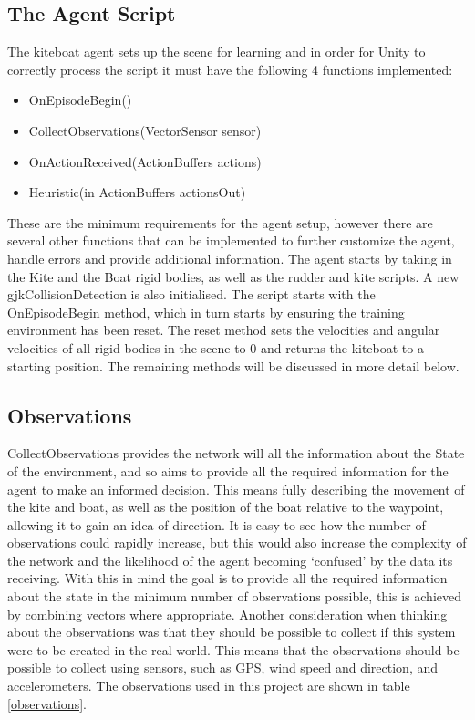 \subsection{The Agent Script}\label{agent_script}
The kiteboat agent sets up the scene for learning and in order for Unity to correctly process the script it must have the following 4 functions implemented:
\begin{itemize}
    \item OnEpisodeBegin()
    \item CollectObservations(VectorSensor sensor)
    \item OnActionReceived(ActionBuffers actions)
    \item Heuristic(in ActionBuffers actionsOut)
\end{itemize}

These are the minimum requirements for the agent setup, however there are several other functions that can be implemented to further customize the agent, handle errors and provide additional information. The agent starts by taking in the Kite and the Boat rigid bodies, as well as the rudder and kite scripts. A new gjkCollisionDetection is also initialised. The script starts with the OnEpisodeBegin method, which in turn starts by ensuring the training environment has been reset. The reset method sets the velocities and angular velocities of all rigid bodies in the scene to 0 and returns the kiteboat to a starting position. The remaining methods will be discussed in more detail below.


\subsection{Observations}
CollectObservations provides the network will all the information about the State of the environment, and so aims to provide all the required information for the agent to make an informed decision. This means fully describing the movement of the kite and boat, as well as the position of the boat relative to the waypoint, allowing it to gain an idea of direction. It is easy to see how the number of observations could rapidly increase, but this would also increase the complexity of the network and the likelihood of the agent becoming `confused' by the data its receiving. With this in mind the goal is to provide all the required information about the state in the minimum number of observations possible, this is achieved by combining vectors where appropriate. Another consideration when thinking about the observations was that they should be possible to collect if this system were to be created in the real world. This means that the observations should be possible to collect using sensors, such as GPS, wind speed and direction, and accelerometers. The observations used in this project are shown in table$~$\ref{observations}.

